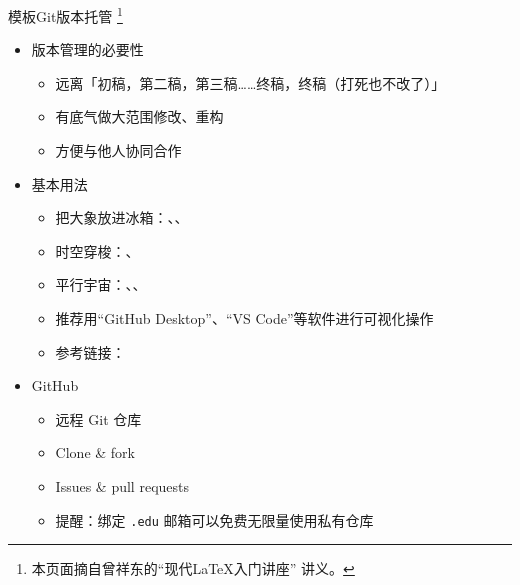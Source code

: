 \documentclass[fontset = none, xcolor=svgnames, t, aspectratio=169]{ctexbeamer}
\begin{document}
\begin{frame}[fragile]{\nwafuthesis 模板}{Git版本托管
    \footnote[frame,1]{本页面摘自曾祥东的\enquote{现代\LaTeX 入门讲座}
      讲义。}}
  \stretchon
  \begin{itemize}
    \item 版本管理的必要性
      \begin{itemize}
        \item 远离「初稿，第二稿，第三稿……终稿，终稿（打死也不改了）」
        \item 有底气做大范围修改、重构
        \item 方便与他人协同合作
      \end{itemize}
    \item 基本用法
      \begin{itemize}
        \item 把大象放进冰箱：、、
        \item 时空穿梭：、
        \item 平行宇宙：、、
        \item 推荐用\enquote{GitHub Desktop}、\enquote{VS Code}等软件进行可视化操作
        \item 参考链接：
      \end{itemize}
    \item GitHub \href{https://github.com}{\faGithub}
      \begin{itemize}
        \item 远程 Git 仓库
        \item Clone \& fork
        \item Issues \& pull requests
        \item \alert{提醒：绑定 \texttt{.edu} 邮箱可以免费无限量使用私有仓库}
      \end{itemize}
  \end{itemize}
  \stretchoff
\end{frame}

\end{document}
